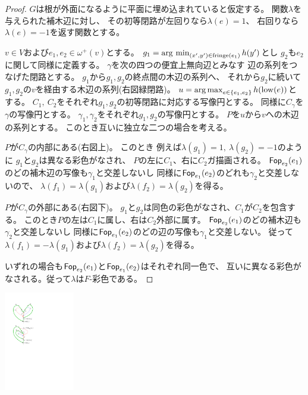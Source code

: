 \begin{paracol}{2}
\begin{proof}
$G$は根が外面になるように平面に埋め込まれていると仮定する。
関数$\lambda$を与えられた補木辺に対し、
その初等閉路が左回りなら$\lambda(e)=1$、
右回りなら$\lambda(e)=-1$を返す関数とする。

$v\in V$および$e_1, e_2 \in \omega^+(v)$とする。
$g_1=\mathop{\rm arg~min}_{(x', y') \in \operatorname{fringe}(e_1)} h(y')$とし
$g_2$も$e_2$に関して同様に定義する。
$\gamma$を次の四つの便宜上無向辺とみなす
辺の系列をつなげた閉路とする。
$g_1$から$g_1, g_2$の終点間の木辺の系列へ、
それから$g_2$に続いて$g_1, g_2$の$v$を経由する木辺の系列(右図緑閉路)。
$u=\operatorname*{arg\,max}_{e\in\{e_1, e_2\}}h(\operatorname{low}(e))$とする。
$C_1,~ C_2$をそれぞれ$g_1, g_2$の初等閉路に対応する写像円とする。
同様に$C_\gamma$を$\gamma$の写像円とする。
$\gamma_1, \gamma_2$をそれぞれ$g_1, g_2$の写像円とする。
$P$を$u$から$v$への木辺の系列とする。
このとき互いに独立な二つの場合を考える。

$P$が$C_\gamma$の内部にある(右図上)。
このとき
例えば$\lambda(g_1)=1,~ \lambda(g_2)=-1$のように
$g_1$と$g_2$は異なる彩色がなされ、
$P$の左に$C_1$、右に$C_2$ガ描画される。
$\operatorname{{\sf Fop}}_{e_2}(e_1)$のどの補木辺の写像も$\gamma_1$と交差しないし
同様に$\operatorname{{\sf Fop}}_{e_1}(e_2)$のどれも$\gamma_2$と交差しないので、
$\lambda(f_1)=\lambda(g_1)$および$\lambda(f_2)=\lambda(g_2)$を得る。

$P$が$C_\gamma$の外部にある(右図下)。
$g_1$と$g_2$は同色の彩色がなされ、$C_1$が$C_2$を包含する。
このとき$P$の左は$C_1$に属し、右は$C_2$外部に属す。
$\operatorname{{\sf Fop}}_{e_2}(e_1)$のどの補木辺も$\gamma_2$と交差しないし
同様に$\operatorname{{\sf Fop}}_{e_1}(e_2)$のどの辺の写像も$\gamma_1$と交差しない。
従って$\lambda(f_1)=-\lambda(g_1)$および$\lambda(f_2)=\lambda(g_2)$を得る。


いずれの場合も$\operatorname{{\sf Fop}}_{e_2}(e_1)$と$\operatorname{{\sf Fop}}_{e_1}(e_2)$はそれぞれ同一色で、
互いに異なる彩色がなされる。従って$\lambda$は$F$-彩色である。
\end{proof}
\switchcolumn
\vspace{.5\intextsep}
\centering
\includegraphics[width=0.23\textwidth]{figures/f_coloring.pdf}
\end{paracol}



